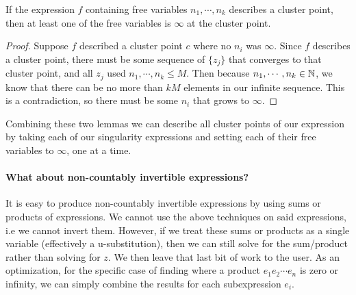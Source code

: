 \begin{lemma}
  If the expression $f$ containing free variables $n_1, \cdots, n_k$ describes
  a cluster point, then at least one of the free variables is $\infty$ at the
  cluster point.
\end{lemma}
\begin{proof}
  Suppose $f$ described a cluster point $c$ where no $n_i$ was $\infty$.
  Since $f$ describes a cluster point, there must be some sequence of
  $\{z_j\}$ that converges to that cluster point, and all $z_j$ used
  $n_1, \cdots, n_k \leq M$. Then because $n_1, \cdots, n_k \in \mathbb{N}$, we
  know that there can be no more than $kM$ elements in our infinite sequence.
  This is a contradiction, so there must be some $n_i$ that grows to $\infty$.
\end{proof}

Combining these two lemmas we can describe all cluster points of our expression
by taking each of our singularity expressions and setting each of their free
variables to $\infty$, one at a time.


\paragraph{What about non-countably invertible expressions?}
It is easy to produce non-countably invertible expressions by using sums
or products of expressions. We cannot use the above techniques on said
expressions, i.e we cannot invert them. However, if we treat these sums
or products as a single variable (effectively a u-substitution), then
we can still solve for the sum/product rather than solving for $z$. We then
leave that last bit of work to the user. As an optimization, for the specific
case of finding where a product $e_1 e_2 \cdots e_n$ is zero or infinity,
we can simply combine the results for each subexpression $e_i$.
